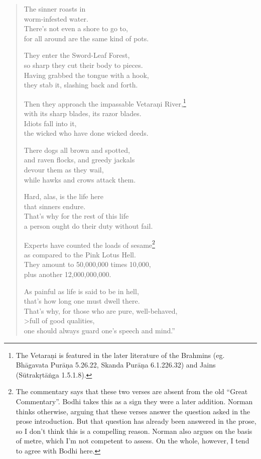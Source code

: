 \documentclass[12pt,openany]{book}%
\begin{document}
\begin{verse}
The sinner roasts in \\
worm-infested water. \\
There’s not even a shore to go to, \\
for all around are the same kind of pots. 

They enter the Sword-Leaf Forest, \\
so sharp they cut their body to pieces. \\
Having grabbed the tongue with a hook, \\
they stab it, slashing back and forth. 

Then they approach the impassable \textsanskrit{Vetaraṇi} River,\footnote{The \textsanskrit{Vetaraṇi} is featured in the later literature of the Brahmins (eg. \textsanskrit{Bhāgavata} \textsanskrit{Purāṇa} 5.26.22, Skanda \textsanskrit{Purāṇa} 6.1.226.32) and Jains (\textsanskrit{Sūtrakṛtāṅga} 1.5.1.8). } \\
with its sharp blades, its razor blades. \\
Idiots fall into it, \\
the wicked who have done wicked deeds. 

There dogs all brown and spotted, \\
and raven flocks, and greedy jackals \\
devour them as they wail, \\
while hawks and crows attack them. 

Hard, alas, is the life here \\
that sinners endure. \\
That’s why for the rest of this life \\
a person ought do their duty without fail. 

Experts have counted the loads of sesame\footnote{The commentary says that these two verses are absent from the old “Great Commentary”. Bodhi takes this as a sign they were a later addition. Norman thinks otherwise, arguing that these verses answer the question asked in the prose introduction. But that question has already been answered in the prose, so I don’t think this is a compelling reason. Norman also argues on the basis of metre, which I’m not competent to assess. On the whole, however, I tend to agree with Bodhi here. } \\
as compared to the Pink Lotus Hell. \\
They amount to 50,000,000 times 10,000, \\
plus another 12,000,000,000. 

As painful as life is said to be in hell, \\
that’s how long one must dwell there. \\
That’s why, for those who are pure, well-behaved, \\>full of good qualities, \\
one should always guard one’s speech and mind.” 

%
\end{verse}
\end{document}
